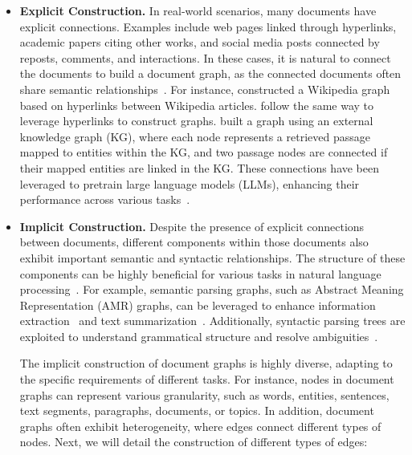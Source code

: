 \begin{itemize}[leftmargin=*]
\item \textbf{Explicit Construction.}  In real-world scenarios, many documents have explicit connections. Examples include web pages linked through hyperlinks, academic papers citing other works, and social media posts connected by reposts, comments, and interactions.  In these cases, it is natural to connect the documents to build a document graph, as the connected documents often share semantic relationships~\citep{peng2024connecting}. For instance, \citet{asai2019learning} constructed a Wikipedia graph based on hyperlinks between Wikipedia articles. \citet{li2022dynamic, li2021graph} follow the same way to leverage hyperlinks to construct graphs. \citet{yu2021kg} built a graph using an external knowledge graph (KG), where each node represents a retrieved passage mapped to entities within the KG, and two passage nodes are connected if their mapped entities are linked in the KG. 
These connections have been leveraged to pretrain large language models (LLMs), enhancing their performance across various tasks~\citep{yasunaga2022linkbert, zou2023pretraining, hu2021relation}.


\item \textbf{Implicit Construction.} Despite the presence of explicit connections between documents, different components within those documents also exhibit important semantic and syntactic relationships. The structure of these components can be highly beneficial for various tasks in natural language processing~\citep{wu2023graph, mihalcea2011graph}. For example, semantic parsing graphs, such as Abstract Meaning Representation (AMR) graphs, can be leveraged to enhance information extraction~\citep{zhang2021abstract, huang2017zero} and text summarization~\citep{dohare2017text}. Additionally, syntactic parsing trees are exploited to understand grammatical structure and resolve ambiguities~\citep{zhang2023survey}.

The implicit construction of document graphs is highly diverse, adapting to the specific requirements of different tasks. For instance, nodes in document graphs can represent various granularity, such as words, entities, sentences, text segments, paragraphs, documents, or topics. In addition, document graphs often exhibit heterogeneity, where edges connect different types of nodes. Next, we will detail the construction of different types of edges:


\end{itemize}
